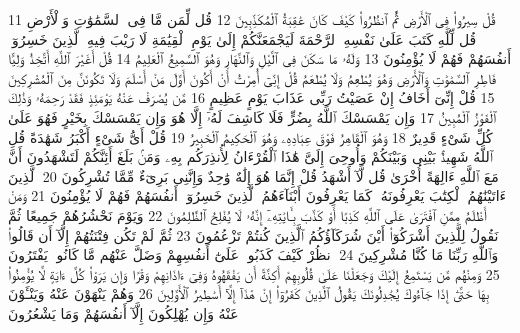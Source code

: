 {\tiny\colorbox{cl_aya}{11}} قُلْ سِيرُوا۟ فِى ٱلْأَرْضِ ثُمَّ ٱنظُرُوا۟ كَيْفَ كَانَ عَٰقِبَةُ ٱلْمُكَذِّبِينَ
{\tiny\colorbox{cl_aya}{12}} قُل لِّمَن مَّا فِى ٱلسَّمَٰوَٰتِ وَٱلْأَرْضِ قُل لِّلَّهِ كَتَبَ عَلَىٰ نَفْسِهِ ٱلرَّحْمَةَ لَيَجْمَعَنَّكُمْ إِلَىٰ يَوْمِ ٱلْقِيَٰمَةِ لَا رَيْبَ فِيهِ ٱلَّذِينَ خَسِرُوٓا۟ أَنفُسَهُمْ فَهُمْ لَا يُؤْمِنُونَ
{\tiny\colorbox{cl_aya}{13}} وَلَهُۥ مَا سَكَنَ فِى ٱلَّيْلِ وَٱلنَّهَارِ وَهُوَ ٱلسَّمِيعُ ٱلْعَلِيمُ
{\tiny\colorbox{cl_aya}{14}} قُلْ أَغَيْرَ ٱللَّهِ أَتَّخِذُ وَلِيًّا فَاطِرِ ٱلسَّمَٰوَٰتِ وَٱلْأَرْضِ وَهُوَ يُطْعِمُ وَلَا يُطْعَمُ قُلْ إِنِّىٓ أُمِرْتُ أَنْ أَكُونَ أَوَّلَ مَنْ أَسْلَمَ وَلَا تَكُونَنَّ مِنَ ٱلْمُشْرِكِينَ
{\tiny\colorbox{cl_aya}{15}} قُلْ إِنِّىٓ أَخَافُ إِنْ عَصَيْتُ رَبِّى عَذَابَ يَوْمٍ عَظِيمٍ
{\tiny\colorbox{cl_aya}{16}} مَّن يُصْرَفْ عَنْهُ يَوْمَئِذٍ فَقَدْ رَحِمَهُۥ وَذَٰلِكَ ٱلْفَوْزُ ٱلْمُبِينُ
{\tiny\colorbox{cl_aya}{17}} وَإِن يَمْسَسْكَ ٱللَّهُ بِضُرٍّ فَلَا كَاشِفَ لَهُۥٓ إِلَّا هُوَ وَإِن يَمْسَسْكَ بِخَيْرٍ فَهُوَ عَلَىٰ كُلِّ شَىْءٍ قَدِيرٌ
{\tiny\colorbox{cl_aya}{18}} وَهُوَ ٱلْقَاهِرُ فَوْقَ عِبَادِهِۦ وَهُوَ ٱلْحَكِيمُ ٱلْخَبِيرُ
{\tiny\colorbox{cl_aya}{19}} قُلْ أَىُّ شَىْءٍ أَكْبَرُ شَهَٰدَةً قُلِ ٱللَّهُ شَهِيدٌۢ بَيْنِى وَبَيْنَكُمْ وَأُوحِىَ إِلَىَّ هَٰذَا ٱلْقُرْءَانُ لِأُنذِرَكُم بِهِۦ وَمَنۢ بَلَغَ أَئِنَّكُمْ لَتَشْهَدُونَ أَنَّ مَعَ ٱللَّهِ ءَالِهَةً أُخْرَىٰ قُل لَّآ أَشْهَدُ قُلْ إِنَّمَا هُوَ إِلَٰهٌ وَٰحِدٌ وَإِنَّنِى بَرِىٓءٌ مِّمَّا تُشْرِكُونَ
{\tiny\colorbox{cl_aya}{20}} ٱلَّذِينَ ءَاتَيْنَٰهُمُ ٱلْكِتَٰبَ يَعْرِفُونَهُۥ كَمَا يَعْرِفُونَ أَبْنَآءَهُمُ ٱلَّذِينَ خَسِرُوٓا۟ أَنفُسَهُمْ فَهُمْ لَا يُؤْمِنُونَ
{\tiny\colorbox{cl_aya}{21}} وَمَنْ أَظْلَمُ مِمَّنِ ٱفْتَرَىٰ عَلَى ٱللَّهِ كَذِبًا أَوْ كَذَّبَ بِـَٔايَٰتِهِۦٓ إِنَّهُۥ لَا يُفْلِحُ ٱلظَّٰلِمُونَ
{\tiny\colorbox{cl_aya}{22}} وَيَوْمَ نَحْشُرُهُمْ جَمِيعًا ثُمَّ نَقُولُ لِلَّذِينَ أَشْرَكُوٓا۟ أَيْنَ شُرَكَآؤُكُمُ ٱلَّذِينَ كُنتُمْ تَزْعُمُونَ
{\tiny\colorbox{cl_aya}{23}} ثُمَّ لَمْ تَكُن فِتْنَتُهُمْ إِلَّآ أَن قَالُوا۟ وَٱللَّهِ رَبِّنَا مَا كُنَّا مُشْرِكِينَ
{\tiny\colorbox{cl_aya}{24}} ٱنظُرْ كَيْفَ كَذَبُوا۟ عَلَىٰٓ أَنفُسِهِمْ وَضَلَّ عَنْهُم مَّا كَانُوا۟ يَفْتَرُونَ
{\tiny\colorbox{cl_aya}{25}} وَمِنْهُم مَّن يَسْتَمِعُ إِلَيْكَ وَجَعَلْنَا عَلَىٰ قُلُوبِهِمْ أَكِنَّةً أَن يَفْقَهُوهُ وَفِىٓ ءَاذَانِهِمْ وَقْرًا وَإِن يَرَوْا۟ كُلَّ ءَايَةٍ لَّا يُؤْمِنُوا۟ بِهَا حَتَّىٰٓ إِذَا جَآءُوكَ يُجَٰدِلُونَكَ يَقُولُ ٱلَّذِينَ كَفَرُوٓا۟ إِنْ هَٰذَآ إِلَّآ أَسَٰطِيرُ ٱلْأَوَّلِينَ
{\tiny\colorbox{cl_aya}{26}} وَهُمْ يَنْهَوْنَ عَنْهُ وَيَنْـَٔوْنَ عَنْهُ وَإِن يُهْلِكُونَ إِلَّآ أَنفُسَهُمْ وَمَا يَشْعُرُونَ
